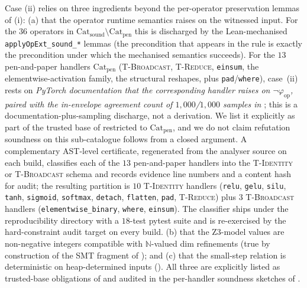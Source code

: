 \begin{remark}
\label{rem:tcb-thm-ii}
Case (ii) relies on three ingredients beyond the per-operator
preservation lemmas of (i): (a) that the operator runtime
semantics raises on the witnessed input. For the $36$ operators in
$\mathrm{Cat}_{\mathrm{sound}}\setminus\mathrm{Cat}_{\mathrm{pen}}$
this is discharged by the Lean-mechanised
\texttt{applyOpExt\_sound\_*} lemmas (the precondition that
appears in the rule is exactly the precondition under which the
mechanised semantics succeeds). For the $13$ pen-and-paper
handlers $\mathrm{Cat}_{\mathrm{pen}}$
(\textsc{T-Broadcast}, \textsc{T-Reduce}, \texttt{einsum}, the
elementwise-activation family, the structural reshapes, plus
\texttt{pad}/\texttt{where}), case~(ii) rests on
\emph{PyTorch documentation that the corresponding handler
raises on $\neg\varphi_{\mathrm{op}}$, paired with the in-envelope
agreement count of $1{,}000$/$1{,}000$ samples in
}; this is a documentation-plus-sampling
discharge, not a derivation. We list it explicitly as part of the
trusted base of  restricted to
$\mathrm{Cat}_{\mathrm{pen}}$, and we do not claim refutation
soundness on this sub-catalogue follows from a closed argument.
A complementary AST-level certificate, regenerated from the
analyser source on each build, classifies each of the $13$
pen-and-paper handlers into the \textsc{T-Identity} or
\textsc{T-Broadcast} schema and records evidence line numbers
and a content hash for audit; the resulting partition is
$10$ \textsc{T-Identity} handlers (\texttt{relu}, \texttt{gelu},
\texttt{silu}, \texttt{tanh}, \texttt{sigmoid},
\texttt{softmax}, \texttt{detach}, \texttt{flatten},
\texttt{pad}, \textsc{T-Reduce}) plus $3$ \textsc{T-Broadcast}
handlers (\texttt{elementwise\_binary}, \texttt{where},
\texttt{einsum}). The classifier ships under the
reproducibility directory with a $18$-test pytest suite and is
re-exercised by the hard-constraint audit target on every
build.
(b) that the Z3-model values are non-negative integers compatible
with $\mathbb{N}$-valued dim refinements (true by construction of
the SMT fragment of ); and (c) that the
small-step relation is deterministic on heap-determined inputs
(). All three are explicitly listed as
trusted-base obligations of  and audited in
the per-handler soundness sketches of .
\end{remark}

